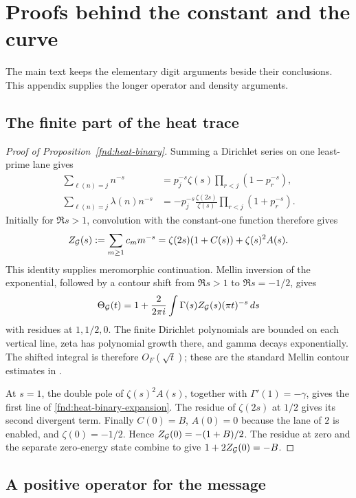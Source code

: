 \section{Proofs behind the constant and the curve}\label{app:foundations}

The main text keeps the elementary digit arguments beside their conclusions. This appendix supplies the longer operator and density arguments.

\subsection{The finite part of the heat trace}\label{app:fnd:heat-binary}

\begin{proof}[Proof of Proposition~\ref{fnd:heat-binary}]
Summing a Dirichlet series on one least-prime lane gives
\begin{align*}
 \sum_{\ell(n)=j}n^{-s}
 &=p_j^{-s}\zeta(s)\prod_{r<j}(1-p_r^{-s}),\\
 \sum_{\ell(n)=j}\lambda(n)n^{-s}
 &=-p_j^{-s}\frac{\zeta(2s)}{\zeta(s)}
     \prod_{r<j}(1+p_r^{-s}).
\end{align*}
Initially for $\Re s>1$, convolution with the constant-one
function therefore gives
\begin{equation}
 Z_{\mathcal G}(s):=\sum_{m\ge1}c_mm^{-s}
 =\zeta(2s)(1+C(s))+\zeta(s)^2A(s).
 \label{fnd:spectral-zeta}
\end{equation}
This identity supplies meromorphic continuation.  Mellin inversion
of the exponential, followed by a contour shift from $\Re s>1$
to $\Re s=-1/2$, gives
\[
 \Theta_{\mathcal G}(t)=1+\frac2{2\pi i}\int
 \Gamma(s)Z_{\mathcal G}(s)(\pi t)^{-s}\,ds
\]
with residues at $1,1/2,0$.  The finite Dirichlet polynomials are
bounded on each vertical line, zeta has polynomial growth there,
and gamma decays exponentially.  The shifted integral is therefore
$O_F(\sqrt t)$; these are the standard Mellin contour estimates
in \cite[Section 2.5]{fndDLMF}.

At $s=1$, the double pole of $\zeta(s)^2A(s)$, together with
$\Gamma'(1)=-\gamma$, gives the first line of
\eqref{fnd:heat-binary-expansion}.  The residue of $\zeta(2s)$
at $1/2$ gives its second divergent term.  Finally $C(0)=B$,
$A(0)=0$ because the lane of $2$ is enabled, and
$\zeta(0)=-1/2$.  Hence $Z_{\mathcal G}(0)=-(1+B)/2$.
The residue at zero and the separate zero-energy state combine
to give $1+2Z_{\mathcal G}(0)=-B$.
\end{proof}

\subsection{A positive operator for the message}\label{app:fnd:mask-operator}

